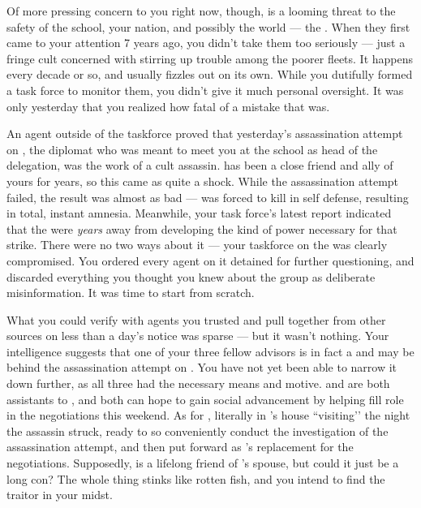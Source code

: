 \documentclass[char]{GL2020}
\begin{document}
Of more pressing concern to you right now, though, is a looming threat to the safety of the school, your nation, and possibly the world — the \pGoaties{}. When they first came to your attention 7 years ago, you didn't take them too seriously — just a fringe cult concerned with stirring up trouble among the poorer \pShippie{} fleets. It happens every decade or so, and usually fizzles out on its own. While you dutifully formed a task force to monitor them, you didn't give it much personal oversight. It was only yesterday that you realized how fatal of a mistake that was. 

An agent outside of the taskforce proved that yesterday's assassination attempt on \cHeadDiplomat{\full}, the diplomat who was meant to meet you at the school as head of the \pShip{} delegation, was the work of a cult assassin. \cHeadDiplomat{} has been a close friend and ally of yours for years, so this came as quite a shock. While the assassination attempt failed, the result was almost as bad — \cHeadDiplomat{} was forced to kill in self defense, resulting in total, instant amnesia. Meanwhile, your task force's latest report indicated that the \pGoaties{} were \emph{years} away from developing the kind of power necessary for that strike. There were no two ways about it — your taskforce on the \pGoaties{} was clearly compromised. You ordered every agent on it detained for further questioning, and discarded everything you thought you knew about the group as deliberate misinformation. It was time to start from scratch.

What you could verify with agents you trusted and pull together from other sources on less than a day's notice was sparse — but it wasn't nothing. Your intelligence suggests that one of your three fellow \pShip{} advisors is in fact a \pGoatie{} and may be behind the assassination attempt on \cHeadDiplomat{}. You have not yet been able to narrow it down further, as all three had the necessary means and motive. \cChupLeader{\full} and \cJuniorStatesman{\full} are both assistants to \cHeadDiplomat{}, and both can hope to gain social advancement by helping fill \cHeadDiplomat{\their} role in the negotiations this weekend. As for \cEbbPriest{\full}, \cEbbPriest{\theywere} literally in \cHeadDiplomat{}’s house ``visiting’’ the night the assassin struck, ready to so conveniently conduct the investigation of the assassination attempt, and then put \cEbbPriest{\themself} forward as \cHeadDiplomat{}'s replacement for the negotiations. Supposedly, \cEbbPriest{} is a lifelong friend of \cHeadDiplomat{}'s spouse, but could it just be a long con? The whole thing stinks like rotten fish, and you intend to find the traitor in your midst.
\end{document}

